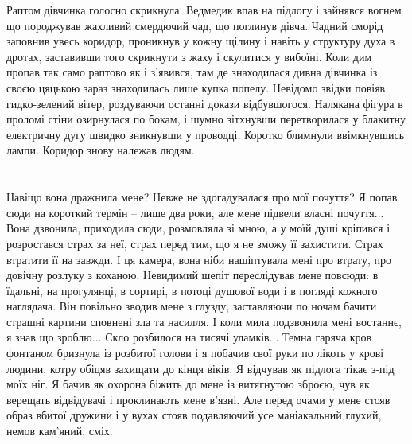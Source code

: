 \documentclass[a4paper,oneside]{book}
\begin{document}
Раптом дівчинка голосно скрикнула. Ведмедик впав на підлогу і зайнявся вогнем
що породжував жахливий смердючий чад, що поглинув дівча. Чадний сморід
заповнив увесь коридор, проникнув у кожну щілину і навіть у  структуру духа в
дротах, заставивши того скрикнути з жаху і скулитися у вибоїні. Коли дим
пропав так само раптово як і з’явився, там де знаходилася дивна дівчинка із
своєю цяцькою зараз знаходилась лише купка попелу. Невідомо звідки повіяв
гидко-зелений вітер, роздуваючи останні докази відбувшогося. Налякана фігура в
проломі стіни озирнулася по бокам, і шумно зітхнувши перетворилася у блакитну
електричну дугу швидко зникнувши у проводці. Коротко блимнули ввімкнувшись
лампи. Коридор знову належав людям.

\section*{} 
 
Навіщо вона дражнила мене? Невже не здогадувалася про мої почуття? Я попав
сюди на короткий термін – лише два роки, але мене підвели власні
почуття... Вона дзвонила, приходила сюди, розмовляла зі мною, а у моїй душі
кріпився і розростався страх за неї, страх перед тим, що я не зможу її
захистити. Страх втратити її на завжди. І ця камера, вона ніби нашіптувала
мені про втрату, про довічну розлуку з коханою. Невидимий шепіт переслідував
мене повсюди: в їдальні, на прогулянці, в сортирі, в потоці душової води і в
погляді кожного наглядача. Він повільно зводив мене з глузду, заставляючи по
ночам бачити страшні картини сповнені зла та насилля. І коли мила подзвонила
мені востаннє, я знав що зроблю... Скло розбилося на тисячі уламків... Темна
гаряча кров фонтаном бризнула із розбитої голови і я побачив свої руки по
лікоть у крові людини, котру обіцяв захищати до кінця віків. Я відчував як
підлога тікає з-під моїх ніг. Я бачив як охорона біжить до мене із витягнутою
зброєю, чув як верещать відвідувачі і проклинають мене в’язні. Але перед очами
у мене стояв образ вбитої дружини і у вухах стояв подавляючий усе маніакальний
глухий, немов кам’яний, сміх.

\section*{}
 
\end{document}

